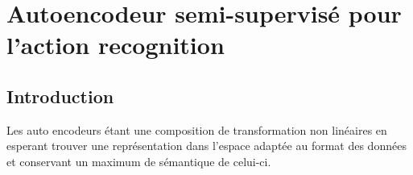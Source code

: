 \begin{table}[H]
\centering
{}
\caption{Résulats obtenus grâce à la normalisation DFS sur JHMDB \cite{jhuang2013towards} (Squelettes corps humain 2D)}
\end{table}



\section{Autoencodeur semi-supervisé pour l'action recognition}

\subsection{Introduction}
Les auto encodeurs étant une composition de transformation non linéaires en esperant trouver une représentation dans l'espace adaptée au format des données et conservant un maximum de sémantique de celui-ci.

